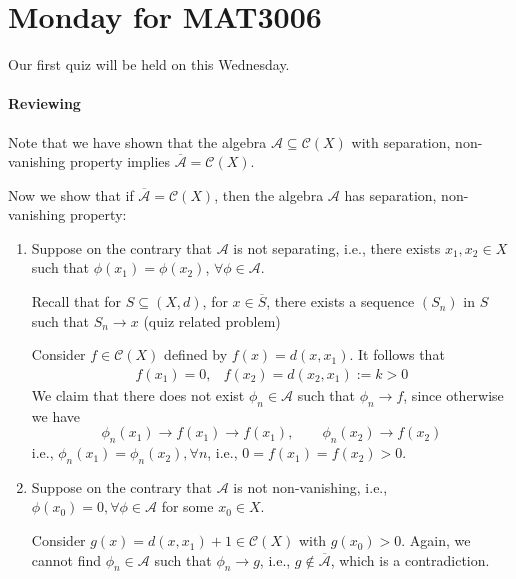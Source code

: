 \section{Monday for MAT3006}
Our first quiz will be held on this Wednesday.

\paragraph{Reviewing}
Note that we have shown that the algebra $\mathcal{A}\subseteq\mathcal{C}(X)$ with separation, non-vanishing property implies $\overline{\mathcal{A}} = \mathcal{C}(X)$.

Now we show that if $\overline{\mathcal{A}} = \mathcal{C}(X)$, then the algebra $\mathcal{A}$ has separation, non-vanishing property:
\begin{enumerate}
\item
Suppose on the contrary that $\mathcal{A}$ is not separating, i.e., there exists $x_1,x_2\in X$ such that $\phi(x_1)=\phi(x_2)$, $\forall\phi\in\mathcal{A}$.

Recall that for $S\subseteq(X,d)$, for $x\in\overline{S}$, there exists a sequence $(S_n)$ in $S$ such that $S_n\to x$ (quiz related problem)

Consider $f\in\mathcal{C}(X)$ defined by $f(x) = d(x,x_1)$. It follows that
\[
\begin{array}{ll}
f(x_1)=0,
&
f(x_2) = d(x_2,x_1):=k>0
\end{array}
\]
We claim that there does not exist $\phi_n\in\mathcal{A}$ such that $\phi_n\to f$, since otherwise we have 
\[
\phi_n(x_1)\to f(x_1)\to f(x_1),\qquad
\phi_n(x_2)\to f(x_2)
\]
i.e., $\phi_n(x_1)=\phi_n(x_2),\forall n$, i.e., $0=f(x_1)=f(x_2)>0$.
\item
Suppose on the contrary that $\mathcal{A}$ is not non-vanishing, i.e., $\phi(x_0)=0,\forall \phi\in\mathcal{A}$ for some $x_0\in X$.

Consider $g(x) = d(x,x_1)+1\in\mathcal{C}(X)$ with $g(x_0)>0$.
Again, we cannot find $\phi_n\in\mathcal{A}$ such that $\phi_n\to g$, i.e., $g\notin\overline{\mathcal{A}}$, which is a contradiction.
\end{enumerate}


